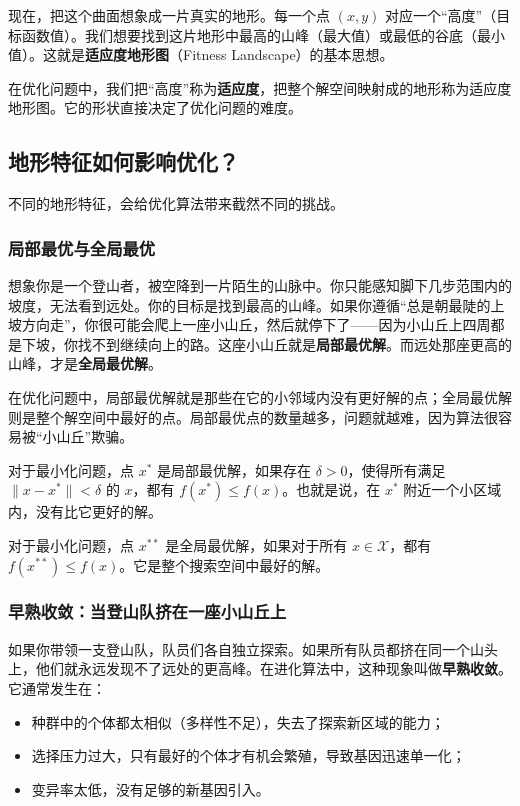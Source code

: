 \documentclass[lang=cn,zihao=-4,a4paper,fontset=windows]{beautybook}
\begin{document}
现在，把这个曲面想象成一片真实的地形。每一个点 $(x,y)$ 对应一个“高度”（目标函数值）。我们想要找到这片地形中最高的山峰（最大值）或最低的谷底（最小值）。这就是\textbf{适应度地形图}（Fitness Landscape）的基本思想。

在优化问题中，我们把“高度”称为\textbf{适应度}，把整个解空间映射成的地形称为适应度地形图。它的形状直接决定了优化问题的难度。

\subsection{地形特征如何影响优化？}

不同的地形特征，会给优化算法带来截然不同的挑战。

\subsubsection{局部最优与全局最优}

想象你是一个登山者，被空降到一片陌生的山脉中。你只能感知脚下几步范围内的坡度，无法看到远处。你的目标是找到最高的山峰。如果你遵循“总是朝最陡的上坡方向走”，你很可能会爬上一座小山丘，然后就停下了——因为小山丘上四周都是下坡，你找不到继续向上的路。这座小山丘就是\textbf{局部最优解}。而远处那座更高的山峰，才是\textbf{全局最优解}。

在优化问题中，局部最优解就是那些在它的小邻域内没有更好解的点；全局最优解则是整个解空间中最好的点。局部最优点的数量越多，问题就越难，因为算法很容易被“小山丘”欺骗。

\begin{definition}[][局部最优解]
对于最小化问题，点 $x^*$ 是局部最优解，如果存在 $\delta > 0$，使得所有满足 $\|x - x^*\| < \delta$ 的 $x$，都有 $f(x^*) \leq f(x)$。也就是说，在 $x^*$ 附近一个小区域内，没有比它更好的解。
\end{definition}

\begin{definition}[][全局最优解]
对于最小化问题，点 $x^{**}$ 是全局最优解，如果对于所有 $x \in \mathcal{X}$，都有 $f(x^{**}) \leq f(x)$。它是整个搜索空间中最好的解。
\end{definition}

\subsubsection{早熟收敛：当登山队挤在一座小山丘上}

如果你带领一支登山队，队员们各自独立探索。如果所有队员都挤在同一个山头上，他们就永远发现不了远处的更高峰。在进化算法中，这种现象叫做\textbf{早熟收敛}。它通常发生在：
\begin{itemize}
    \item 种群中的个体都太相似（多样性不足），失去了探索新区域的能力；
    \item 选择压力过大，只有最好的个体才有机会繁殖，导致基因迅速单一化；
    \item 变异率太低，没有足够的新基因引入。
\end{itemize}
\end{document}
